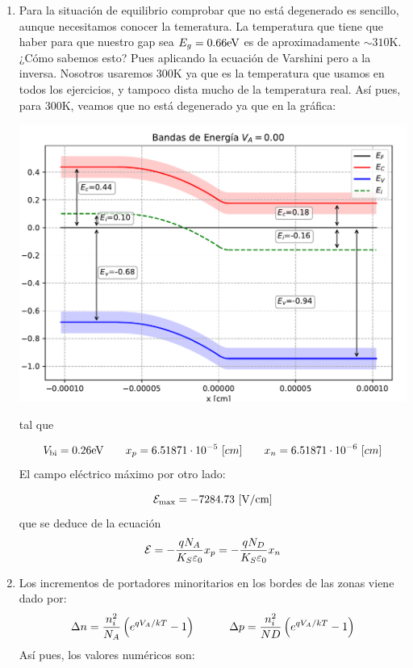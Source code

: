 \begin{enumerate}[label=\alph*)]
    \item Para la situación de equilibrio comprobar que no está degenerado es sencillo, aunque necesitamos conocer la temeratura. La temperatura que tiene que haber para que nuestro gap sea $E_g=0.66\text{eV}$ es de aproximadamente $\sim 310$K. ¿Cómo sabemos esto? Pues aplicando la ecuación de Varshini pero a la inversa. Nosotros usaremos $300$K ya que es la temperatura que usamos en todos los ejercicios, y tampoco dista mucho de la temperatura real. Así pues, para 300K, veamos que no está degenerado ya que en la gráfica: 
    \begin{center}
        \includegraphics[width=0.6\linewidth]{Cuerpo/Ch_03/03_08_Bandas.pdf}
    \end{center}
    tal que 

    \begin{equation}
        V_{\text{bi}} = 0.26 \text{eV} \qquad x_p=6.51871 \cdot 10^{-5} \ [cm] \qquad 
        x_n= 6.51871 \cdot 10^{-6} \ [cm]
    \end{equation}
    El campo eléctrico máximo por otro lado: 

    \begin{equation}
        \Ecal_{\max}=-7284.73 \ [\unit{V/cm}]
    \end{equation}
    que se deduce de la ecuación 
    \begin{equation}
        \mathcal{E} = - \frac{qN_A}{K_S\varepsilon_0} x_p = - \frac{qN_D}{K_S\varepsilon_0} x_n
    \end{equation}
    \item  Los incrementos de portadores minoritarios en los bordes de las zonas viene dado por:
    \begin{equation}
        \Delta n = \frac{n_i^2}{N_A} \left( e^{qV_A/kT}-1 \right)  \quad \quad \quad 
        \Delta p = \frac{n_i^2}{ND} \left( e^{qV_A/kT}-1 \right) 
    \end{equation}
    Así pues, los valores numéricos son:


\end{enumerate}
